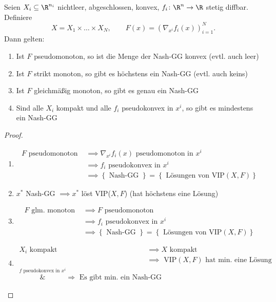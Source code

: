 \begin{satz}
	Seien $X_{i}\subseteq \R^{n_{i}}$ nichtleer, abgeschlossen, konvex, $f_{i} \colon \R^{n} \rightarrow \R $ stetig diffbar. Definiere
	\[
		X = X_1 \times  \ldots \times X_{N}, \qquad F(x) = \left( \nabla _{x^{i}}f_{i}(x) \right)_{i=1}^{N}  
	.\] 
	Dann gelten:
	\begin{enumerate}[label=(\alph{enumi})]
		\item Ist $F$ pseudomonoton, so ist die Menge der Nash-GG konvex (evtl. auch leer)
		\item Ist $F$ strikt monoton, so gibt es höchstens ein Nash-GG (evtl. auch keins)
		\item Ist $F$ gleichmäßig monoton, so gibt es genau ein Nash-GG
		\item Sind alle $X_{i}$ kompakt und alle $f_{i}$ pseudokonvex in $x^{i}$, so gibt es mindestens ein Nash-GG
	\end{enumerate}
\end{satz}

\begin{proof}
	\begin{enumerate}[label=(\alph{enumi})]
		\item
			\begin{align*}
				F \text{ pseudomonoton } & \implies \nabla _{x^{i}}f_{i}(x) \text{ pseudomonoton in }{x}^{i} \\
										 &\implies f_{i}\text{ pseudokonvex in }{x}^{i} \\
										 &\implies \left\{ \text{ Nash-GG } \right\} = \left\{ \text{ Lösungen von VIP}(X,F) \right\} 	
			\end{align*}
		\item ${x}^{*}$ Nash-GG $\implies {x}^{*}$ löst VIP($X,F$) (hat höchstens eine Lösung)
		\item
			\begin{align*}
				F \text{ glm. monoton } &\implies F \text{ pseudomonoton } \\
										&\implies f_{i} \text{ pseudokonvex in }x^{i} \\
										&\implies \left\{ \text{ Nash-GG } \right\} = \left\{ \text{ Lösungen von VIP}(X,F) \right\} 	
			\end{align*}
		\item
			\begin{align*}
				X_{i} \text{ kompakt } &\implies X \text{ kompakt } \\
									   &\implies \text{ VIP}(X,F) \text{ hat min. eine Lösung } \\
									   \overset{f \text{ pseudokonvex in } x^{i}}&{\Longrightarrow} \text{ Es gibt min. ein Nash-GG }
			\end{align*}
	\end{enumerate}
\end{proof}

